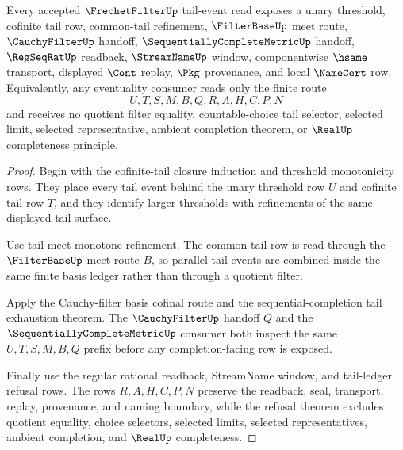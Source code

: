 \begin{theorem}
\label{thm:frechetfilter-tail-eventuality-obligations}
Every accepted $\FrechetFilterUp$ tail-event read exposes a unary threshold, cofinite tail row, common-tail refinement, $\FilterBaseUp$ meet route, $\CauchyFilterUp$ handoff, $\SequentiallyCompleteMetricUp$ handoff, $\RegSeqRatUp$ readback, $\StreamNameUp$ window, componentwise $\hsame$ transport, displayed $\Cont$ replay, $\Pkg$ provenance, and local $\NameCert$ row. Equivalently, any eventuality consumer reads only the finite route
$$
U,T,S,M,B,Q,R,A,H,C,P,N
$$
and receives no quotient filter equality, countable-choice tail selector, selected limit, selected representative, ambient completion theorem, or $\RealUp$ completeness principle.
\end{theorem}
\begin{proof}
Begin with the cofinite-tail closure induction and threshold monotonicity rows. They place every tail event behind the unary threshold row $U$ and cofinite tail row $T$, and they identify larger thresholds with refinements of the same displayed tail surface.

Use tail meet monotone refinement. The common-tail row is read through the $\FilterBaseUp$ meet route $B$, so parallel tail events are combined inside the same finite basis ledger rather than through a quotient filter.

Apply the Cauchy-filter basis cofinal route and the sequential-completion tail exhaustion theorem. The $\CauchyFilterUp$ handoff $Q$ and the $\SequentiallyCompleteMetricUp$ consumer both inspect the same $U,T,S,M,B,Q$ prefix before any completion-facing row is exposed.

Finally use the regular rational readback, StreamName window, and tail-ledger refusal rows. The rows $R,A,H,C,P,N$ preserve the readback, seal, transport, replay, provenance, and naming boundary, while the refusal theorem excludes quotient equality, choice selectors, selected limits, selected representatives, ambient completion, and $\RealUp$ completeness.
\end{proof}

